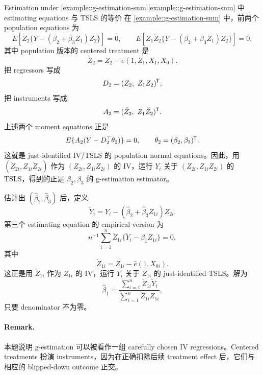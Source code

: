 \begin{exercisesolution}{Estimation under \cref{example::g-estimation-snm}}{\cref{example::g-estimation-snm} 中 estimating equations 与 TSLS 的等价}
在 \cref{example::g-estimation-snm} 中，前两个 population equations 为
\[
E\left[\check Z_2\{Y-(\beta_2+\beta_3Z_1)Z_2\}\right]=0,
\qquad
E\left[Z_1\check Z_2\{Y-(\beta_2+\beta_3Z_1)Z_2\}\right]=0,
\]
其中 population 版本的 centered treatment 是
\[
\check Z_2=Z_2-e(1,Z_1,X_1,X_0).
\]
把 regressors 写成
\[
D_2=(Z_2,\ Z_1Z_2)\tran,
\]
把 instruments 写成
\[
A_2=(\check Z_2,\ Z_1\check Z_2)^{\mkern-1.5mu\mathsf{T}}.
\]
上述两个 moment equations 正是
\[
E\{A_2(Y-D_2^\top\theta_2)\}=0,
\qquad
\theta_2=(\beta_2,\beta_3)^{\mkern-1.5mu\mathsf{T}}.
\]
这就是 just-identified IV/TSLS 的 population normal equations。因此，用 $(\check Z_{2i},Z_{1i}\check Z_{2i})$ 作为 $(Z_{2i},Z_{1i}Z_{2i})$ 的 IV，运行 $Y_i$ 关于 $(Z_{2i},Z_{1i}Z_{2i})$ 的 TSLS，得到的正是 $\beta_2,\beta_3$ 的 g-estimation estimator。

估计出 $(\hat\beta_2,\hat\beta_3)$ 后，定义
\[
\tilde Y_i
=
Y_i-(\hat\beta_2+\hat\beta_3Z_{1i})Z_{2i}.
\]
第三个 estimating equation 的 empirical version 为
\[
n^{-1}\sum_{i=1}^n
\check Z_{1i}\{\tilde Y_i-\beta_1Z_{1i}\}=0,
\]
其中
\[
\check Z_{1i}=Z_{1i}-\hat e(1,X_{0i}).
\]
这正是用 $\check Z_{1i}$ 作为 $Z_{1i}$ 的 IV，运行 $\tilde Y_i$ 关于 $Z_{1i}$ 的 just-identified TSLS。解为
\[
\hat\beta_1
=
\frac{\sum_{i=1}^n\check Z_{1i}\tilde Y_i}
{\sum_{i=1}^n\check Z_{1i}Z_{1i}},
\]
只要 denominator 不为零。

\paragraph{Remark.}
本题说明 g-estimation 可以被看作一组 carefully chosen IV regressions。Centered treatments 扮演 instruments，因为在正确扣除后续 treatment effect 后，它们与相应的 blipped-down outcome 正交。
\end{exercisesolution}

